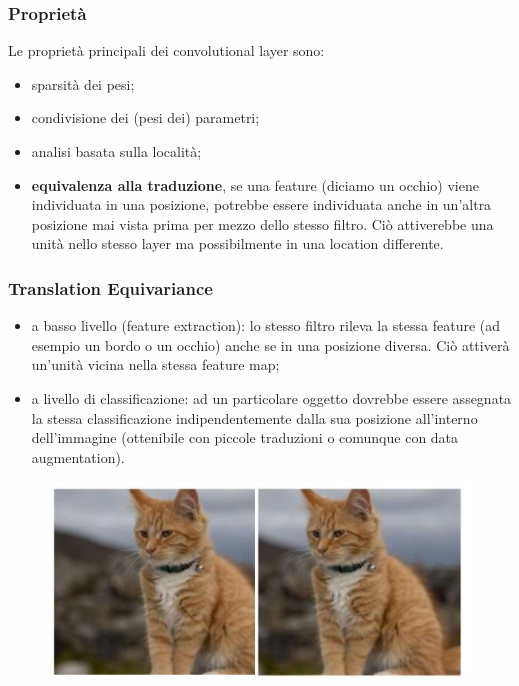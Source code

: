 \subsubsection{Proprietà}
Le proprietà principali dei convolutional layer sono:
\begin{itemize}
    \item sparsità dei pesi;
    \item condivisione dei (pesi dei) parametri;
    \item analisi basata sulla località;
    \item \textbf{equivalenza alla traduzione}, se una feature (diciamo un occhio) viene individuata in una posizione, potrebbe essere individuata anche in un'altra posizione mai vista prima per mezzo dello stesso filtro. Ciò attiverebbe una unità nello stesso layer ma possibilmente in una location differente.
\end{itemize}
\subsubsection{Translation Equivariance}
\begin{itemize}
    \item a basso livello (feature extraction): lo stesso filtro rileva la stessa feature (ad esempio un bordo o un occhio) anche se in una posizione diversa. Ciò attiverà un'unità vicina nella stessa feature map;
    \item a livello di classificazione: ad un particolare oggetto dovrebbe essere assegnata la stessa classificazione indipendentemente dalla sua posizione all'interno dell'immagine (ottenibile con piccole traduzioni o comunque con data augmentation).
\end{itemize}
\begin{figure}[!h]
    \includegraphics[scale=.5]{images/cnn/trans_inv.png}
    \centering
\end{figure}
\newpage
